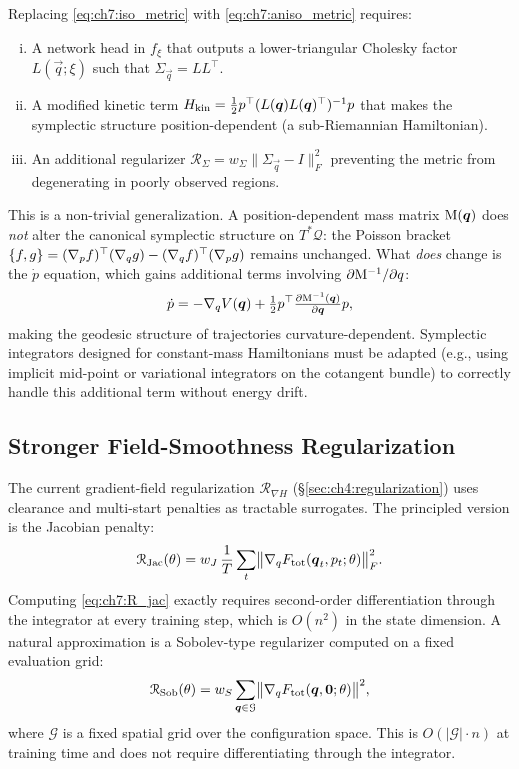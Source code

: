 Replacing \eqref{eq:ch7:iso_metric} with
\eqref{eq:ch7:aniso_metric} requires:
\begin{enumerate}[(i)]
  \item A network head in $f_\xi$ that outputs a lower-triangular
        Cholesky factor $L(\vec{q};\xi)$ such that
        $\Sigma_{\vec{q}} = LL^\top$.
  \item A modified kinetic term
        $H_{\mathrm{kin}} = \frac{1}{2}p^\top
        (L(\boldsymbol{q})L(\boldsymbol{q})^\top)^{-1}p$
        that makes the symplectic structure position-dependent
        (a sub-Riemannian Hamiltonian).
  \item An additional regularizer
        $\mathcal{R}_\Sigma = w_\Sigma\|\Sigma_{\vec{q}} - I\|_F^2$
        preventing the metric from degenerating in poorly observed
        regions.
\end{enumerate}
This is a non-trivial generalization.
A position-dependent mass matrix $\mathrm{M}(\boldsymbol{q})$ does \emph{not}
alter the canonical symplectic structure on $T^*\mathcal{Q}$: the
Poisson bracket $\{f,g\} = (\nabla_{p} f)^\top(\nabla_{q}
g) - (\nabla_{q} f)^\top(\nabla_{p} g)$ remains unchanged.
What \emph{does} change is the $\dot{p}$ equation, which gains
additional terms involving $\partial\mathrm{M}^{-1}/\partial q$:
\[
  \dot{p} = -\nabla_{q} V(\boldsymbol{q})
            + \tfrac{1}{2}p^\top
              \tfrac{\partial \mathrm{M}^{-1}(\boldsymbol{q})}{\partial \boldsymbol{q}}
              p,
\]
making the geodesic structure of trajectories curvature-dependent.
Symplectic integrators designed for constant-mass Hamiltonians
must be adapted (e.g., using implicit mid-point or variational
integrators on the cotangent bundle) to correctly handle this
additional term without energy drift.

\subsection{Stronger Field-Smoothness Regularization}
\label{subsec:ch7:sobolev}

The current gradient-field regularization $\mathcal{R}_{\nabla H}$
(§\ref{sec:ch4:regularization}) uses clearance and multi-start
penalties as tractable surrogates.
The principled version is the Jacobian penalty:
\begin{equation}
  \mathcal{R}_{\mathrm{Jac}}(\theta)
  = w_J\,\frac{1}{T}\sum_t
    \bigl\|\nabla_q F_{\mathrm{tot}}(\boldsymbol{q}_t,p_t;\theta)\bigr\|_F^2.
  \label{eq:ch7:R_jac}
\end{equation}
Computing \eqref{eq:ch7:R_jac} exactly requires second-order
differentiation through the integrator at every training step,
which is $O(n^2)$ in the state dimension.
A natural approximation is a Sobolev-type regularizer computed
on a fixed evaluation grid:
\begin{equation}
  \mathcal{R}_{\mathrm{Sob}}(\theta)
  = w_S\sum_{\boldsymbol{q} \in \mathcal{G}}
    \bigl\|\nabla_q F_{\mathrm{tot}}(\boldsymbol{q},\mathbf{0};\theta)\bigr\|^2,
  \label{eq:ch7:R_sob}
\end{equation}
where $\mathcal{G}$ is a fixed spatial grid over the configuration
space.
This is $O(|\mathcal{G}| \cdot n)$ at training time and does not
require differentiating through the integrator.

